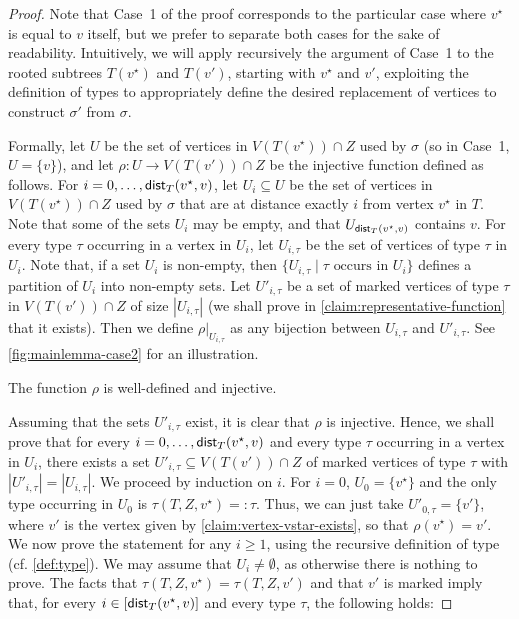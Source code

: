\documentclass[a4paper,UKenglish,cleveref, autoref, thm-restate]{lipics-v2021}
\newenvironment{cproof}{\proof[Proof of claim]\renewcommand\qedsymbol{$\diamond$}}{\endproof}
\newcommand{\dist}{{\sf dist}\xspace}
\begin{document}
\begin{proof}
Note that Case~1 of the proof corresponds to the particular case where $v^{\star}$ is equal to $v$ itself, but we prefer to separate both cases for the sake of readability. Intuitively, we will apply recursively the argument of Case~1 to the rooted subtrees $T(v^{\star})$ and $T(v')$, starting with $v^{\star}$ and $v'$, exploiting the definition of types to appropriately define the desired replacement of vertices to construct  $\sigma'$ from  $\sigma$.

Formally, let $U$ be the set of vertices in $V(T(v^{\star})) \cap Z$ used by $\sigma$ (so in Case~1, $U=\{v\}$), and let $\rho: U \to V(T(v')) \cap Z$ be the injective function defined as follows. For $i=0,\ldots,\dist_T(v^{\star},v)$, let $U_i \subseteq U$ be the set of vertices in $V(T(v^{\star})) \cap Z$ used by $\sigma$ that are at distance exactly $i$ from vertex $v^{\star}$ in $T$. Note that some of the sets $U_i$ may be empty, and that $U_{\dist_T(v^{\star},v)}$ contains $v$. For every type $\tau$ occurring in a vertex in $U_i$, let $U_{i,\tau}$ be the set of vertices of type $\tau$ in $U_i$. Note that, if a set $U_i$ is non-empty, then $\{U_{i,\tau} \mid \text{$\tau$ occurs in $U_i$}\}$ defines a partition of $U_i$ into non-empty sets. Let $U'_{i,\tau}$ be a set of marked vertices of type $\tau$ in $V(T(v')) \cap Z$ of size $|U_{i,\tau}|$ (we shall prove in \autoref{claim:representative-function} that it exists). Then we define $\rho|_{U_{i,\tau}}$ as any bijection between $U_{i,\tau}$ and $U'_{i,\tau}$. See \autoref{fig:mainlemma-case2} for an illustration.


\begin{claim}\label{claim:representative-function}
The function $\rho$ is well-defined and injective.
\end{claim}
\begin{cproof}
  Assuming that the sets $U'_{i,\tau}$ exist, it is clear that $\rho$ is injective. Hence, we shall prove that for every $i=0,\ldots,\dist_T(v^{\star},v)$ and every type $\tau$ occurring in a vertex in $U_i$, there exists a set $U'_{i,\tau} \subseteq V(T(v')) \cap Z$ of marked vertices of type $\tau$ with $|U'_{i,\tau}| = |U_{i,\tau}|$. We proceed by induction on $i$. For $i=0$, $U_0=\{v^{\star}\}$ and the only type occurring in $U_0$ is $\tau(T,Z,v^{\star})=:\tau$. Thus, we can just take $U'_{0,\tau}=\{v'\}$, where $v'$ is the vertex given by \autoref{claim:vertex-vstar-exists}, so that $\rho(v^{\star}) = v'$. We now prove the statement for any $i \geq 1$, using the recursive definition of type (cf. \autoref{def:type}). We may assume that $U_{i} \neq \emptyset$, as otherwise there is nothing to prove.
The facts that $\tau(T,Z,v^{\star})=\tau(T,Z,v')$ and that $v'$ is marked imply that, for every $i \in [\dist_T(v^{\star},v)]$ and every type $\tau$, the following holds:


\end{cproof}
\end{proof}
\end{document}
